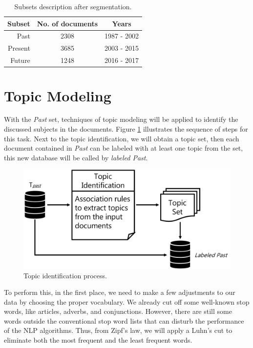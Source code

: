 \begin{table}[h!]
	\centering
	\caption{Subsets description after segmentation.}
	\label{tab:database-description}
	\begin{tabular}{r|cc}
		\toprule
		 Subset & No. of documents &    Years    \\ \midrule
		   Past &       2308       & 1987 - 2002 \\
		Present &       3685       & 2003 - 2015 \\
		 Future &       1248       & 2016 - 2017 \\ \bottomrule
	\end{tabular}
\end{table}

\section{Topic Modeling}

With the \textit{Past} set, techniques of topic modeling will be applied to identify the discussed subjects in the documents. Figure \ref{fig:topic-identification} illustrates the sequence of steps for this task. Next to the topic identification, we will obtain a topic set, then each document contained in \textit{Past} can be labeled with at least one topic from the set, this new database will be called by \textit{labeled Past}.

\begin{figure}[h!]
	\centering
	\includegraphics[width=0.8\linewidth]{01.Chapters/04.Materials/topic-identification}
	\caption{Topic identification process.}
	\label{fig:topic-identification}
\end{figure}

To perform this, in the first place, we need to make a few adjustments to our data by choosing the proper vocabulary. We already cut off some well-known stop words, like articles, adverbs, and conjunctions. However, there are still some words outside the conventional stop word lists that can disturb the performance of the NLP algorithms. Thus, from Zipf's law, we will apply a Luhn's cut
to eliminate both the most frequent and the least frequent words.


